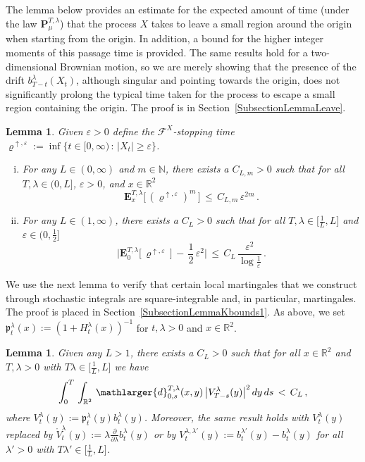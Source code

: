 \documentclass[10pt]{article}
\numberwithin{equation}{section}
\newtheorem{lemma}[theorem]{Lemma}
\theoremstyle{definition}
\newcommand{\R}{{\mathbb R}}
\begin{document}
The lemma below provides an estimate for the expected amount of time (under the law $\mathbf{P}_{\mu}^{T,\lambda}$)  that the process $X$ takes to leave a small region around the origin  when starting from the origin. In addition, a bound for the higher integer moments of this passage time is provided.  The same results hold for a two-dimensional Brownian motion, so we are merely showing that the presence of the drift $b_{T-t}^{\lambda}(X_t)$, although singular and pointing towards the origin, does not significantly prolong the typical time taken for the process to escape a small region containing the origin.  The proof is  in Section~\ref{SubsectionLemmaLeave}. 
\begin{lemma}\label{LemmaLeave} Given $\varepsilon>0$  define the $\mathscr{F}^X$-stopping time    $\varrho^{\uparrow, \varepsilon}:= \inf\{t\in [0,\infty)\,:\, |X_t|\geq \varepsilon \}$. 
\begin{enumerate}[(i)]
\item  For any $L\in (0,\infty)$ and $m\in \mathbb{N}$, there exists a  $C_{L,m}>0$ such that   for all $T,\lambda \in (0,L]$,  $\varepsilon>0$, and  $x\in \R^2$
$$   \mathbf{E}_{x}^{T,\lambda}\big[ \,(\varrho^{\uparrow ,\varepsilon})^m \,\big]\,\leq \, C_{L,m}\,\varepsilon^{2m}   \,. $$

 
 
 
\item For any $L\in (1,\infty)$, there exists a  $C_{L}>0$ such that for all $T,\lambda\in \big[\frac{1}{L},L\big] $ and $\varepsilon \in (0,\frac{1}{2}]$
$$  \bigg| \mathbf{E}_{0}^{T,\lambda}\big[ \,\varrho^{\uparrow, \varepsilon} \,\big]\,-\,\frac{1}{2}\,\varepsilon^2 \bigg|\,\leq \, C_{L}\,\frac{\varepsilon^2}{\log \frac{1}{\varepsilon} }\,.  $$


\end{enumerate}

\end{lemma}


We use the next  lemma to verify that certain local martingales that we construct through stochastic integrals are square-integrable and, in particular, martingales.  The proof is placed in Section~\ref{SubsectionLemmaKbounds1}.  As above, we set $\mathfrak{p}_{t}^{\lambda}(x):= ( 1+H_{t}^{\lambda}( x) )^{-1}$ for  $t,\lambda > 0$  and $x\in \R^2$. 
\begin{lemma} \label{LemmaKbounds1}  Given any $L>1$, there exists a  $C_L>0$ such that for  all $x\in \R^2$ and  $T,\lambda >0$ with $ T\lambda \in \big[\frac{1}{L}, L\big]$ we have 
\begin{align}\label{SupSquar}
  \int_0^{T}\,\int_{\R^2} \, \mathlarger{d}_{0,s}^{T,\lambda}(x,y)\, \big|V_{T-s}^{\lambda}(y)\big|^2 \,   dy \,  ds \,<\,C_L \, ,
\end{align}
where   $V_t^{\lambda}(y):=\mathfrak{p}_t^{\lambda}(y)b_t^{\lambda}(y) $.
Moreover, the same result holds with $V_t^{\lambda}(y)$ replaced by $\mathring{V}_{t}^{ \lambda }(y):=  \lambda\frac{\partial }{ \partial \lambda } b_t^{\lambda}(y) $ or by $V_t^{\lambda,\lambda'}(y):=b_t^{\lambda'}(y)-b_t^{\lambda}(y)$ for all $\lambda' > 0$ with $ T\lambda' \in \big[\frac{1}{L}, L\big]$.
\end{lemma}
\end{document}
